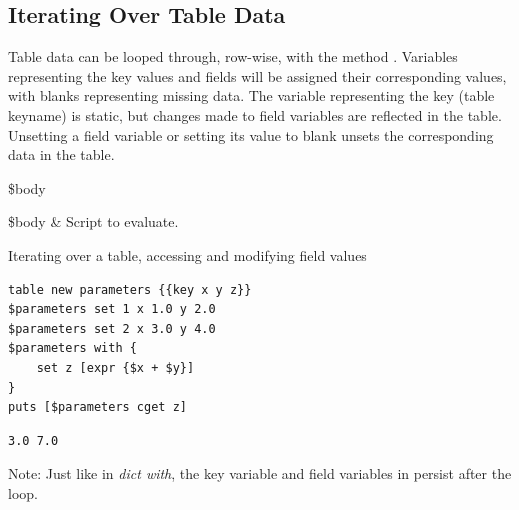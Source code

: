 \subsection{Iterating Over Table Data}
Table data can be looped through, row-wise, with the method . 
Variables representing the key values and fields will be assigned their corresponding values, with blanks representing missing data. 
The variable representing the key (table keyname) is static, but changes made to field variables are reflected in the table. 
Unsetting a field variable or setting its value to blank unsets the corresponding data in the table. 
\begin{syntax}
 \$body
\end{syntax}
\begin{args}
\$body & Script to evaluate.
\end{args}
\begin{example}{Iterating over a table, accessing and modifying field values}
\begin{lstlisting}
table new parameters {{key x y z}}
$parameters set 1 x 1.0 y 2.0
$parameters set 2 x 3.0 y 4.0
$parameters with {
    set z [expr {$x + $y}]
}
puts [$parameters cget z]
\end{lstlisting}
\tcblower
\begin{lstlisting}
3.0 7.0
\end{lstlisting}
\end{example}
Note: Just like in \textit{dict with}, the key variable and field variables in  persist after the loop.
\clearpage
